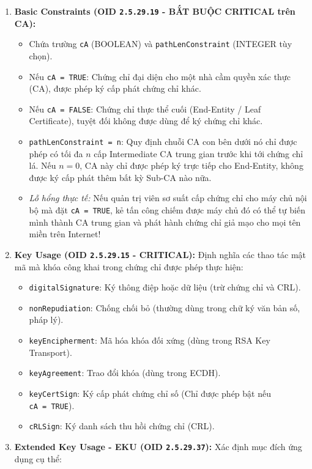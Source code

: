 \documentclass[
]{article}
\providecommand{\tightlist}{%
  \setlength{\itemsep}{0pt}\setlength{\parskip}{0pt}}
\begin{document}
\begin{enumerate}
\def\labelenumi{\arabic{enumi}.}
\tightlist
\item
  \textbf{Basic Constraints (OID \texttt{2.5.29.19} - BẮT BUỘC CRITICAL
  trên CA):}

  \begin{itemize}
  \tightlist
  \item
    Chứa trường \texttt{cA} (BOOLEAN) và \texttt{pathLenConstraint}
    (INTEGER tùy chọn).
  \item
    Nếu \texttt{cA\ =\ TRUE}: Chứng chỉ đại diện cho một nhà cầm quyền
    xác thực (CA), được phép ký cấp phát chứng chỉ khác.
  \item
    Nếu \texttt{cA\ =\ FALSE}: Chứng chỉ thực thể cuối (End-Entity /
    Leaf Certificate), tuyệt đối không được dùng để ký chứng chỉ khác.
  \item
    \texttt{pathLenConstraint\ =\ n}: Quy định chuỗi CA con bên dưới nó
    chỉ được phép có tối đa \(n\) cấp Intermediate CA trung gian trước
    khi tới chứng chỉ lá. Nếu \(n = 0\), CA này chỉ được phép ký trực
    tiếp cho End-Entity, không được ký cấp phát thêm bất kỳ Sub-CA nào
    nữa.
  \item
    \emph{Lỗ hổng thực tế:} Nếu quản trị viên sơ suất cấp chứng chỉ cho
    máy chủ nội bộ mà đặt \texttt{cA\ =\ TRUE}, kẻ tấn công chiếm được
    máy chủ đó có thể tự biến mình thành CA trung gian và phát hành
    chứng chỉ giả mạo cho mọi tên miền trên Internet!
  \end{itemize}
\item
  \textbf{Key Usage (OID \texttt{2.5.29.15} - CRITICAL):} Định nghĩa các
  thao tác mật mã mà khóa công khai trong chứng chỉ được phép thực hiện:

  \begin{itemize}
  \tightlist
  \item
    \texttt{digitalSignature}: Ký thông điệp hoặc dữ liệu (trừ chứng chỉ
    và CRL).
  \item
    \texttt{nonRepudiation}: Chống chối bỏ (thường dùng trong chữ ký văn
    bản số, pháp lý).
  \item
    \texttt{keyEncipherment}: Mã hóa khóa đối xứng (dùng trong RSA Key
    Transport).
  \item
    \texttt{keyAgreement}: Trao đổi khóa (dùng trong ECDH).
  \item
    \texttt{keyCertSign}: Ký cấp phát chứng chỉ số (Chỉ được phép bật
    nếu \texttt{cA\ =\ TRUE}).
  \item
    \texttt{cRLSign}: Ký danh sách thu hồi chứng chỉ (CRL).
  \end{itemize}
\item
  \textbf{Extended Key Usage - EKU (OID \texttt{2.5.29.37}):} Xác định
  mục đích ứng dụng cụ thể:


\end{enumerate}
\end{document}

